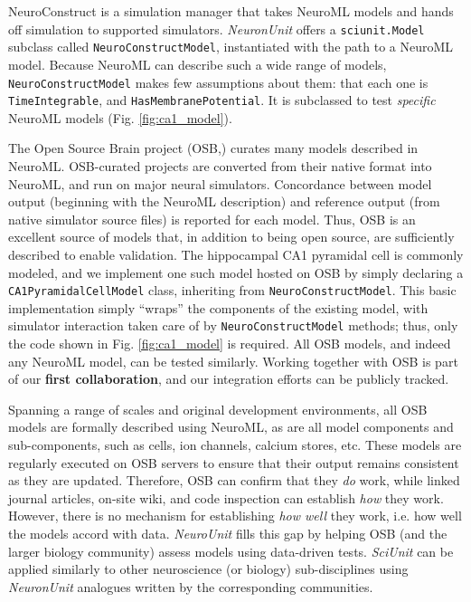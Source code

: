 \documentclass[11pt,letterpaper]{article}
\let\verbx\lstinline
\begin{document}
NeuroConstruct\cite{neuroconstruct_url,gleeson_neuroconstruct:_2007} is a simulation manager that takes NeuroML models and hands off simulation to supported simulators. 
\textit{NeuronUnit} offers a \verbx{sciunit.Model} subclass called \verbx{NeuroConstructModel}, instantiated with the path to a NeuroML model.  
Because NeuroML can describe such a wide range of models, \verbx{NeuroConstructModel} makes few assumptions about them: that each one is \verbx{TimeIntegrable}, and \verbx{HasMembranePotential}.  
It is subclassed to test \textit{specific} NeuroML models (Fig. \ref{fig:ca1_model}). 

The Open Source Brain project (OSB,\cite{osb_url}) curates many models described in NeuroML. 
OSB-curated projects are converted from their native format into NeuroML, and run on major neural simulators\cite{neuron_url,genesis_url,nest_url,moose_url}. 
Concordance between model output (beginning with the NeuroML description) and reference output (from native simulator source files) is reported for each model. 
Thus, OSB is an excellent source of models that, in addition to being open source, are sufficiently described to enable validation. 
The hippocampal CA1 pyramidal cell is commonly modeled, and we implement one such model hosted on OSB\cite{osb_ca1_url} by simply declaring a \verbx{CA1PyramidalCellModel} class, inheriting from \verbx{NeuroConstructModel}.  
This basic implementation simply ``wraps'' the components of the existing model, with simulator interaction taken care of by \verbx{NeuroConstructModel} methods; 
thus, only the code shown in Fig. \ref{fig:ca1_model} is required. 
All OSB models, and indeed any NeuroML model, can be tested similarly. 
Working together with OSB is part of our \textbf{first collaboration}, and our integration efforts can be publicly tracked\cite{neuroconstruct_rgerkin_url}.  

Spanning a range of scales and original development environments, all OSB models are formally described using NeuroML, as are all model components and sub-components, such as cells, ion channels, calcium stores, etc. 
These models are regularly executed on OSB servers to ensure that their output remains consistent as they are updated. 
Therefore, OSB can confirm that they \textit{do} work, while linked journal articles, on-site wiki, and code inspection can establish \textit{how} they work. 
However, there is no mechanism for establishing \textit{how well} they work, i.e. how well the models accord with data. 
\textit{NeuroUnit} fills this gap by helping OSB (and the larger biology community) assess models using data-driven tests. 
\textit{SciUnit} can be applied similarly to other neuroscience (or biology) sub-disciplines using \textit{NeuronUnit} analogues written by the corresponding communities.    
\end{document}
